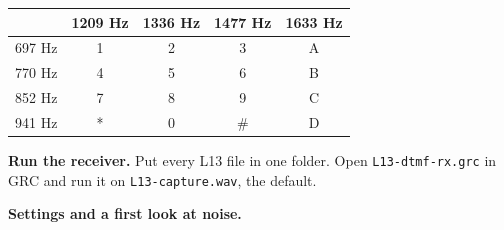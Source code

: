 \documentclass{exam}
\makeatletter
\def\keysol#1{\ifcsname keysol@#1\endcsname\csname keysol@#1\endcsname\fi}
\makeatother
\begin{document}
\begin{center}
\renewcommand{\arraystretch}{1.2}
\begin{tabular}{| c | c | c | c | c |}
\hline
 & 1209 Hz & 1336 Hz & 1477 Hz & 1633 Hz \\\hline
697 Hz & 1 & 2 & 3 & A \\\hline
770 Hz & 4 & 5 & 6 & B \\\hline
852 Hz & 7 & 8 & 9 & C \\\hline
941 Hz & * & 0 & \# & D \\\hline
\end{tabular}
\end{center}

\begin{questions}


\question \textbf{Run the receiver.} Put every L13 file in one folder. Open
\texttt{L13-dtmf-rx.grc} in GRC and run it on \texttt{L13-capture.wav}, the default.


\newpage
\question \textbf{Settings and a first look at noise.}


\end{questions}
\end{document}
